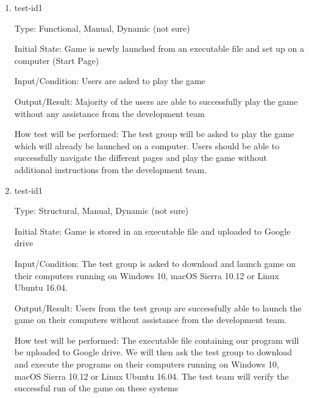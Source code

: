 \documentclass[12pt, titlepage]{article}
\begin{document}
\begin{enumerate}


\item{test-id1\\}

Type: Functional, Manual, Dynamic (not sure)
					
Initial State: Game is newly launched from an executable file and set up on a computer (Start Page)
					
Input/Condition: Users are asked to play the game
					
Output/Result: Majority of the users are able to successfully play the game without any assistance from the development team
					
How test will be performed: The test group will be asked to play the game which will already be launched on a computer. Users should be able to successfully navigate the different pages and play the game without additional instructions from the development team.

\item{test-id1\\}

Type: Structural, Manual, Dynamic (not sure)
					
Initial State: Game is stored in an executable file and uploaded to Google drive
					
Input/Condition: The test group is asked to download and launch game on their computers running on  Windows 10, macOS Sierra 10.12 or Linux Ubuntu 16.04.
					
Output/Result: Users from the test group are successfully able to launch the game on their computers without assistance from the development team.
					
How test will be performed: The executable file containing our program will be uploaded to Google drive. We will then ask the test group to download and execute the programs on their computers running on  Windows 10, macOS Sierra 10.12 or Linux Ubuntu 16.04. The test team will verify the successful run of the game on these systems


\end{enumerate}
\end{document}
